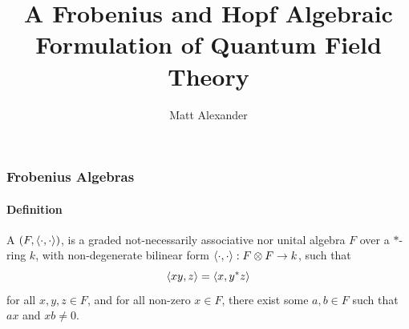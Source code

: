 \documentclass{beamer}
\title{A Frobenius and Hopf Algebraic Formulation of Quantum Field Theory}
\author{Matt Alexander}
\begin{document}


\begin{frame}

\titlepage


\end{frame}
















\begin{frame}

\frametitle{Frobenius Algebras}

\framesubtitle{Definition}

A  $(F, \left\langle \cdot, \cdot \right\rangle)$, is a graded not-necessarily associative nor unital algebra $F$ over a $*$-ring $k$, with non-degenerate bilinear form $\left\langle \cdot, \cdot \right\rangle: F \otimes F \to k$, such that
\begin{equation}
\left\langle xy,z \right\rangle = \left\langle x,y^* z \right\rangle
\end{equation}
for all $x,y,z \in F$, and for all non-zero $x \in F$, there exist some $a,b \in F$ such that $a x$ and $x b \ne 0$.

\end{frame}



\end{document}
